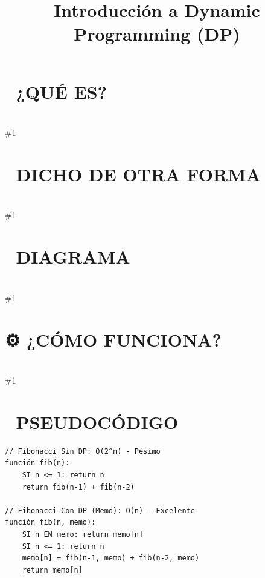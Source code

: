 \documentclass{article}
\newcommand{\quees}[1]{\section*{🤔 ¿QUÉ ES?}\hrulefill \\ \#1}
\newcommand{\dichodeotraforma}[1]{\section*{💬 DICHO DE OTRA FORMA}\hrulefill \\ \#1}
\newcommand{\diagrama}[1]{\section*{🎨 DIAGRAMA}\hrulefill \\ \#1}
\newcommand{\comofunciona}[1]{\section*{⚙️ ¿CÓMO FUNCIONA?}\hrulefill \\ \#1}
\begin{document}
\title{Introducción a Dynamic Programming (DP)}
\date{}
\maketitle
\quees{Un estudiante inteligente que guarda sus apuntes 📒. 

Imagina que en un examen te preguntan 50 veces cuánto es 123 x 456.
En lugar de hacer la multiplicación cada vez (y perder tiempo),
la haces la primera vez, anotas el resultado en tu cuaderno, y 
las siguientes 49 veces ¡solo lo consultas!

Dynamic Programming es simplemente eso: guardar resultados de 
sub-problemas ya resueltos para no repetir trabajo innecesariamente. 
Es el arte de intercambiar un poco de memoria por mucho tiempo.}
\dichodeotraforma{Dynamic Programming (DP) es una técnica de optimización para resolver
problemas complejos dividiéndolos en sub-problemas más pequeños. 

Para usar DP, el problema debe cumplir dos condiciones:
1. Overlapping Subproblems: El mismo sub-problema se calcula varias
   veces (como en Fibonacci).
2. Optimal Substructure: La solución óptima del problema global se
   puede construir a partir de las soluciones óptimas de sus partes.}
\diagrama{\begin{verbatim}
Sin DP (Calculas lo mismo muchas veces):
             fib(5)
           /        \
      fib(4)         fib(3)
      /    \        /      \
  fib(3)  fib(2)  fib(2)  fib(1)
  /    \
fib(2) fib(1)

¡Nota cómo fib(3) y fib(2) se repiten! 💀

Con DP (Memoization):
Calculas fib(3) una vez, lo guardas, y cuando fib(4) lo necesite,
simplemente lo lee de la memoria. ⚡
\end{verbatim}}
\comofunciona{Existen dos formas de implementar DP:

1. Top-Down (Memoization):
   - Empiezas con el problema grande.
   - Lo divides recursivamente.
   - Guardas el resultado en un Hash Map o Array antes de regresarlo.

2. Bottom-Up (Tabulation):
   - Empiezas con los casos más pequeños (base cases).
   - Llenas una tabla (array) paso a paso hasta llegar al resultado.
   - Generalmente se hace con un loop iterativo.}
\section*{📝 PSEUDOCÓDIGO}
\hrulefill
\begin{verbatim}
// Fibonacci Sin DP: O(2^n) - Pésimo
función fib(n):
    SI n <= 1: return n
    return fib(n-1) + fib(n-2)

// Fibonacci Con DP (Memo): O(n) - Excelente
función fib(n, memo):
    SI n EN memo: return memo[n]
    SI n <= 1: return n
    memo[n] = fib(n-1, memo) + fib(n-2, memo)
    return memo[n]
\end{verbatim}
\end{document}
